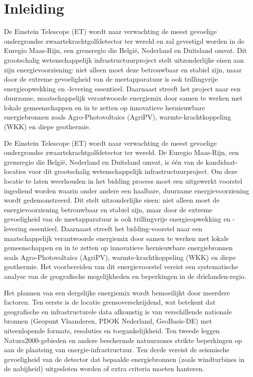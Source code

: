 \section{Inleiding}%
\label{sec:inleiding}

De Einstein Telescope (ET) wordt naar verwachting de meest gevoelige ondergrondse zwaartekrachtgolfdetector ter wereld en zal gevestigd worden in de Euregio Maas-Rijn, een grensregio die België, Nederland en Duitsland omvat. Dit grootschalig wetenschappelijk infrastructuurproject stelt uitzonderlijke eisen aan zijn energievoorziening: niet alleen moet deze betrouwbaar en stabiel zijn, maar door de extreme gevoeligheid van de meetapparatuur is ook trillingvrije energieopwekking en -levering essentieel. Daarnaast streeft het project naar een duurzame, maatschappelijk verantwoorde energiemix door samen te werken met lokale gemeenschappen en in te zetten op innovatieve hernieuwbare energiebronnen zoals Agro-Photovoltaics (AgriPV), warmte-krachtkoppeling (WKK) en diepe geothermie.

De Einstein Telescope (ET) wordt naar verwachting de meest gevoelige ondergrondse zwaartekrachtgolfdetector ter wereld. De Euregio Maas-Rijn, een grensregio die België, Nederland en Duitsland omvat, is één van de kandidaat-locaties voor dit grootschalig wetenschappelijk infrastructuurproject. Om deze locatie te laten weerhouden in het bidding process moet een uitgewerkt voorstel ingediend worden waarin onder andere een haalbare, duurzame energievoorziening wordt gedemonstreerd. Dit stelt uitzonderlijke eisen: niet alleen moet de energievoorziening betrouwbaar en stabiel zijn, maar door de extreme gevoeligheid van de meetapparatuur is ook trillingvrije energieopwekking en -levering essentieel. Daarnaast streeft het bidding-voorstel naar een maatschappelijk verantwoorde energiemix door samen te werken met lokale gemeenschappen en in te zetten op innovatieve hernieuwbare energiebronnen zoals Agro-Photovoltaics (AgriPV), warmte-krachtkoppeling (WKK) en diepe geothermie. Het voorbereiden van dit energievoorstel vereist een systematische analyse van de geografische mogelijkheden en beperkingen in de drielanden-regio.

Het plannen van een dergelijke energiemix wordt bemoeilijkt door meerdere factoren. Ten eerste is de locatie grensoverschrijdend, wat betekent dat geografische en infrastructurele data afkomstig is van verschillende nationale bronnen (Geopunt Vlaanderen, PDOK Nederland, GeoBasis-DE) met uiteenlopende formats, resoluties en toegankelijkheid. Ten tweede leggen Natura2000-gebieden en andere beschermde natuurzones strikte beperkingen op aan de plaatsing van energie-infrastructuur. Ten derde vereist de seismische gevoeligheid van de detector dat bepaalde energiebronnen (zoals windturbines in de nabijheid) uitgesloten worden of extra criteria moeten hanteren.

